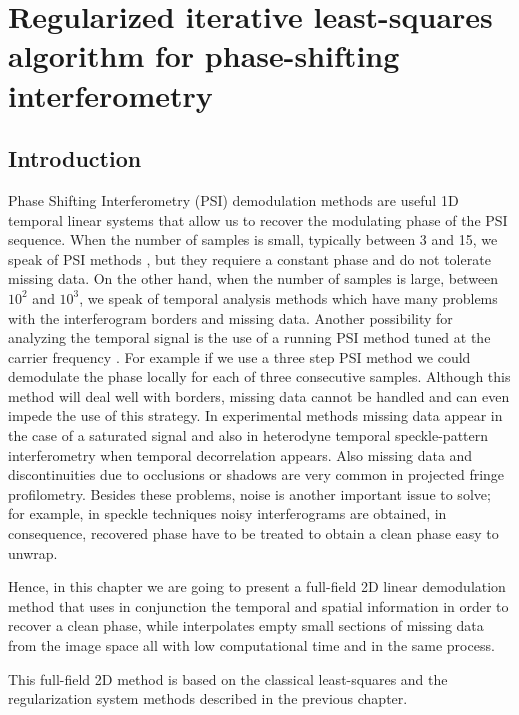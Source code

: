 \chapter{Regularized iterative least-squares algorithm for phase-shifting
interferometry}

\section{Introduction}

Phase Shifting Interferometry (PSI) demodulation methods are useful 1D
temporal linear systems that allow us to recover the modulating phase of the
PSI sequence. When the number of samples is small, typically between 3 and 15,
we speak of PSI methods \cite{Malacara,GeneralTheory}, but they requiere a
constant phase and do not tolerate missing data. On the other hand, when the
number of samples is large, between $10^2$ and $10^3$, we speak of temporal
analysis methods \cite{RQF,temporal_1,temporal_2} which have many problems with
the interferogram borders and missing data. Another possibility for analyzing
the temporal signal is the use of a running PSI method tuned at the carrier
frequency \cite{RQF,temporal_1,temporal_2,Mariano2,Medina,Zeng}. For example if
we use a three step PSI method we could demodulate the phase locally for each of
three consecutive samples. Although this method will deal well with borders,
missing data cannot be handled and can even impede the use of this strategy. In
experimental methods missing data appear in the case of a saturated signal and
also in heterodyne temporal speckle-pattern interferometry when temporal
decorrelation appears. Also missing data and discontinuities due to occlusions
or shadows are very common in projected fringe profilometry. Besides these
problems, noise is another important issue to solve; for example, in speckle
techniques \cite{Malacara,temporal_2} noisy interferograms are obtained, in
consequence, recovered phase have to be treated to obtain a clean phase easy to
unwrap.

Hence, in this chapter we are going to present a full-field 2D linear demodulation
method that uses in conjunction the temporal and spatial information in order
to recover a clean phase, while interpolates empty small sections of missing
data from the image space all with low computational time and in the same
process.

This full-field 2D method is based on the classical least-squares and the 
regularization system methods described in the previous chapter.

